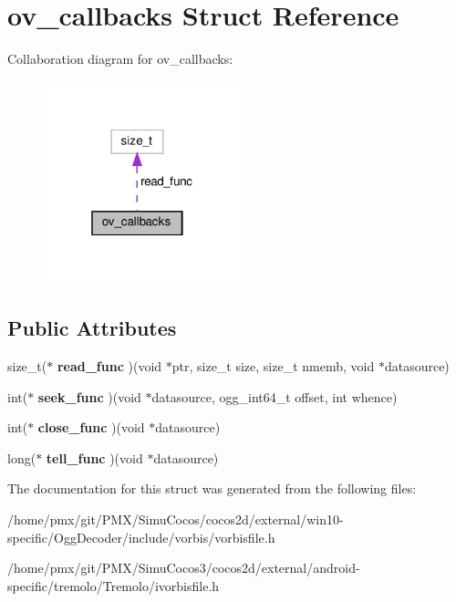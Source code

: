 \hypertarget{structov__callbacks}{}\section{ov\+\_\+callbacks Struct Reference}
\label{structov__callbacks}


Collaboration diagram for ov\+\_\+callbacks\+:
\nopagebreak
\begin{figure}[H]
\begin{center}
\leavevmode
\includegraphics[width=163pt]{structov__callbacks__coll__graph}
\end{center}
\end{figure}
\subsection*{Public Attributes}
\begin{DoxyCompactItemize}
\item 
\mbox{\label{structov__callbacks_a5b4759c6cb3b398197c07bec4b5b6102}} 
size\+\_\+t($\ast$ {\bfseries read\+\_\+func} )(void $\ast$ptr, size\+\_\+t size, size\+\_\+t nmemb, void $\ast$datasource)
\item 
\mbox{\label{structov__callbacks_a0fc2e2644a6e41931324bf2995c2de71}} 
int($\ast$ {\bfseries seek\+\_\+func} )(void $\ast$datasource, ogg\+\_\+int64\+\_\+t offset, int whence)
\item 
\mbox{\label{structov__callbacks_a7bc6240db657fc50e0e9b43d28ffbb49}} 
int($\ast$ {\bfseries close\+\_\+func} )(void $\ast$datasource)
\item 
\mbox{\label{structov__callbacks_ac5626dc0267fdc675353c4bb83cfb06f}} 
long($\ast$ {\bfseries tell\+\_\+func} )(void $\ast$datasource)
\end{DoxyCompactItemize}


The documentation for this struct was generated from the following files\+:\begin{DoxyCompactItemize}
\item 
/home/pmx/git/\+P\+M\+X/\+Simu\+Cocos/cocos2d/external/win10-\/specific/\+Ogg\+Decoder/include/vorbis/vorbisfile.\+h\item 
/home/pmx/git/\+P\+M\+X/\+Simu\+Cocos3/cocos2d/external/android-\/specific/tremolo/\+Tremolo/ivorbisfile.\+h\end{DoxyCompactItemize}
